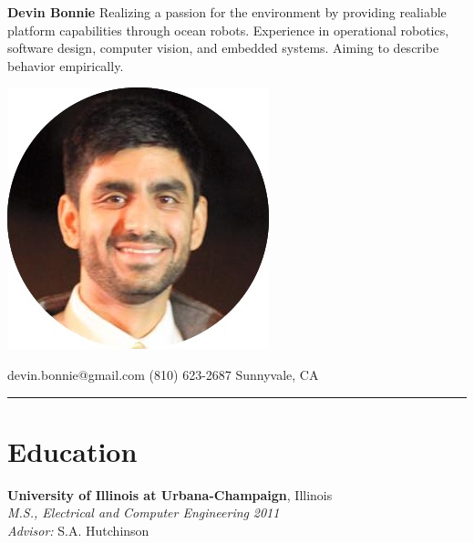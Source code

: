 \documentclass[article]{resume}
\begin{document}
\selectfont 
{
%
\begin{minipage}[t]{0.33\textwidth}
\begin{flushleft}
 \textbf{\large{Devin Bonnie}}
\linebreak
\linebreak
\small{Realizing a passion for the environment by providing realiable platform capabilities through ocean robots. Experience in operational robotics, software design, computer vision, and embedded systems. Aiming to describe behavior empirically.\\}
\vspace*{1\baselineskip}
\end{flushleft}
\end{minipage}	
\begin{minipage}[c]{0.33\textwidth}
\begin{center}
\includegraphics[trim= 0cm 10cm 0 0cm,scale=0.22]{dbCircle}
\end{center}
\end{minipage}
\begin{minipage}[t]{0.33\textwidth}
\begin{flushright}
\vspace*{1\baselineskip}
devin.bonnie@gmail.com
\linebreak
\linebreak
(810) 623-2687
\linebreak
\linebreak
Sunnyvale, CA 
\end{flushright}
\end{minipage}
%
\noindent\rule{\textwidth}{1pt}
%
%
\section{Education}
\vspace*{0.5\baselineskip}
\textbf{University of Illinois at Urbana-Champaign}, Illinois\\
\textsl{M.S., Electrical and Computer Engineering} \hfill \textsl{2011}\\
\textsl{Advisor:} S.A. Hutchinson\vspace{-0.5mm}

}
\end{document}
